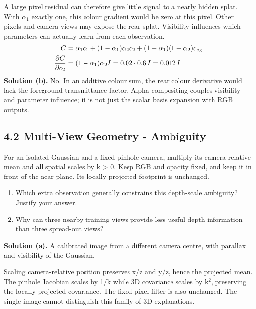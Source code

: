 \documentclass[11pt,a4paper]{article}
\begin{document}
A large pixel residual can therefore give little signal to a nearly hidden splat.
With $\alpha$${}_1$ exactly one, this colour gradient would be zero at this pixel.
Other pixels and camera views may expose the rear splat.
Visibility influences which parameters can actually learn from each observation.
\[
\begin{aligned}C&=\alpha_1c_1+(1-\alpha_1)\alpha_2c_2+(1-\alpha_1)(1-\alpha_2)c_{\rm bg}\\\frac{\partial C}{\partial c_2}&=(1-\alpha_1)\alpha_2 I=0.02\cdot0.6\,I=0.012\,I\end{aligned}
\]
\noindent\textbf{Solution (b).} No.
In an additive colour sum, the rear colour derivative would lack the foreground transmittance factor.
Alpha compositing couples visibility and parameter influence; it is not just the scalar basis expansion with RGB outputs.
\subsection*{4.2 Multi-View Geometry - Ambiguity}
For an isolated Gaussian and a fixed pinhole camera, multiply its camera-relative mean and all spatial scales by k > 0.
Keep RGB and opacity fixed, and keep it in front of the near plane.
Its locally projected footprint is unchanged.
\begin{enumerate}[label=(\alph*),nosep]
\item Which extra observation generally constrains this depth-scale ambiguity?
Justify your answer.
\item Why can three nearby training views provide less useful depth information than three spread-out views?
\end{enumerate}
\noindent\textbf{Solution (a).} A calibrated image from a different camera centre, with parallax and visibility of the Gaussian.

Scaling camera-relative position preserves x/z and y/z, hence the projected mean.
The pinhole Jacobian scales by 1/k while 3D covariance scales by k${}^2$, preserving the locally projected covariance.
The fixed pixel filter is also unchanged.
The single image cannot distinguish this family of 3D explanations.
\end{document}
